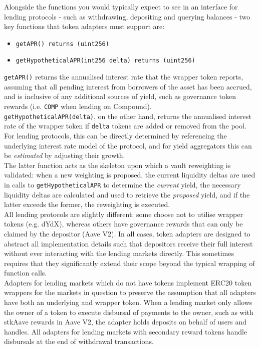 \documentclass{article}
\begin{document}
\noindent
Alongside the functions you would typically expect to see in an interface for lending protocols - such as withdrawing, depositing and querying balances - two key functions that token adapters must support are:

\begin{itemize}
    \item \texttt{getAPR() returns (uint256)}
    \item \texttt{getHypotheticalAPR(int256 delta) returns (uint256)}
\end{itemize}

\noindent
\texttt{getAPR()} returns the annualised interest rate that the wrapper token reports, assuming that all pending interest from borrowers of the asset has been accrued, and is inclusive of any additional sources of yield, such as governance token rewards (i.e. \texttt{COMP} when lending on Compound).\\

\noindent
\texttt{getHypotheticalAPR(delta)}, on the other hand, returns the annualised interest rate of the wrapper token if \texttt{delta} tokens are added or removed from the pool. For lending protocols, this can be directly determined by referencing the underlying interest rate model of the protocol, and for yield aggregators this can be \textit{estimated} by adjusting their growth.\\

\noindent
The latter function acts as the skeleton upon which a vault reweighting is validated: when a new weighting is proposed, the current liquidity deltas are used in calls to \texttt{getHypotheticalAPR} to determine the \textit{current} yield, the necessary liquidity deltas are calculated and used to retrieve the \textit{proposed} yield, and if the latter exceeds the former, the reweighting is executed.\\

\noindent
All lending protocols are slightly different: some choose not to utilise wrapper tokens (e.g. dYdX), whereas others have governance rewards that can only be claimed by the depositor (Aave V2). In all cases, token adapters are designed to abstract all implementation details such that depositors receive their full interest without ever interacting with the lending markets directly. This sometimes requires that they significantly extend their scope beyond the typical wrapping of function calls.\\

\noindent
Adapters for lending markets which do not have tokens implement ERC20 token wrappers for the markets in question to preserve the assumption that all adapters have both an underlying and wrapper token. When a lending market only allows the owner of a token to execute disbursal of payments to the owner, such as with stkAave rewards in Aave V2, the adapter holds deposits on behalf of users and handles. All adapters for lending markets with secondary reward tokens handle disbursals at the end of withdrawal transactions.\\
\end{document}
